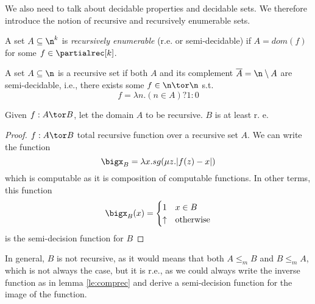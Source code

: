We also need to talk about decidable properties and decidable sets. We
therefore introduce the notion of recursive and recursively enumerable
sets.

\begin{definition}
  A set \(A \subseteq \n^k\) is \emph{recursively enumerable} (r.e. or
  semi-decidable) if \(A = dom(f)\) for some \(f \in \partialrec[k]\).
  
  A set \(A\subseteq \n\) is a recursive set if both \(A\) and its
  complement \(\overline{A} = \n \setminus A\) are semi-decidable,
  i.e., there exists some \(f \in \n \tor \n\) s.t.
  \[f = \lambda n . (n \in A) ? 1 : 0\]
\end{definition}

\begin{lemma}\label{le:comprec}
  Given \(f : A \tor B\), let the domain \(A\) to be recursive. \(B\)
  is at least r. e.
\end{lemma}

\begin{proof}
  \(f : A \tor B\) total recursive function over a recursive set
  \(A\). We can write the function
  \[\bigx_B = \lambda x . sg(\mu z . |f(z) - x|)\] which is computable
  as it is composition of computable functions. In other terms, this
  function
  \begin{equation*}
    \bigx_B(x) =
    \begin{cases}
      1 & x \in B \\
      \uparrow & \text{otherwise}
    \end{cases}
  \end{equation*}
  is the semi-decision function for \(B\)
\end{proof}

\begin{observation}\label{obs:comprec}
  In general, \(B\) is not recursive, as it would means that both \(A
  \leq_m B\) and \(B \leq_m A\), which is not always the case, but it
  is r.e., as we could always write the inverse function as in lemma
  \ref{le:comprec} and derive a semi-decision function for the image
  of the function.
\end{observation}
